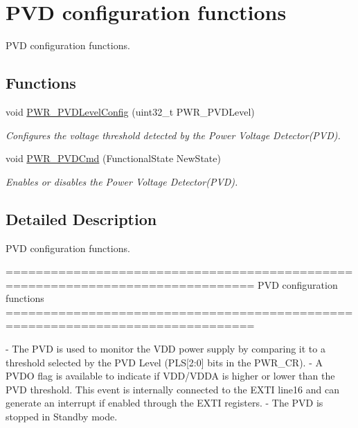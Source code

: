 \hypertarget{group___p_w_r___group2}{}\section{P\+V\+D configuration functions}
\label{group___p_w_r___group2}


P\+V\+D configuration functions.  


\subsection*{Functions}
\begin{DoxyCompactItemize}
\item 
void \hyperlink{group___p_w_r___group2_ga237c143ef6aa55abb8049fa7bf24ab8f}{P\+W\+R\+\_\+\+P\+V\+D\+Level\+Config} (uint32\+\_\+t P\+W\+R\+\_\+\+P\+V\+D\+Level)
\begin{DoxyCompactList}\small\item\em Configures the voltage threshold detected by the Power Voltage Detector(\+P\+V\+D). \end{DoxyCompactList}\item 
void \hyperlink{group___p_w_r___group2_ga42cad476b816e0a33594a933b3ed1acd}{P\+W\+R\+\_\+\+P\+V\+D\+Cmd} (Functional\+State New\+State)
\begin{DoxyCompactList}\small\item\em Enables or disables the Power Voltage Detector(\+P\+V\+D). \end{DoxyCompactList}\end{DoxyCompactItemize}


\subsection{Detailed Description}
P\+V\+D configuration functions. 

\begin{DoxyVerb} ===============================================================================
                           PVD configuration functions
 ===============================================================================  

 - The PVD is used to monitor the VDD power supply by comparing it to a threshold
   selected by the PVD Level (PLS[2:0] bits in the PWR_CR).
 - A PVDO flag is available to indicate if VDD/VDDA is higher or lower than the 
   PVD threshold. This event is internally connected to the EXTI line16
   and can generate an interrupt if enabled through the EXTI registers.
 - The PVD is stopped in Standby mode.\end{DoxyVerb}
 

